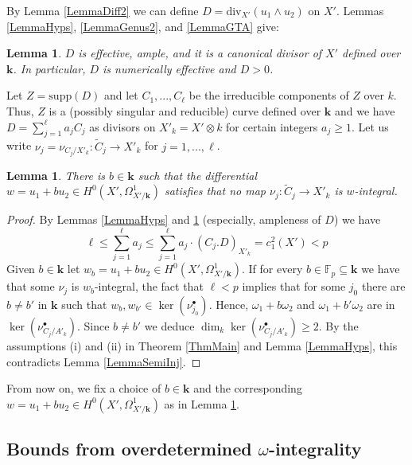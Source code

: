 \documentclass[11pt]{amsart}
\newtheorem{lemma}[theorem]{Lemma}
\theoremstyle{remark}
\numberwithin{equation}{section}
\newcommand{\F}{\mathbb{F}}
\newcommand{\kk}{\mathbf{k}}
\newcommand{\supp}{\mathrm{supp}}
\newcommand{\divi}{\mathrm{div}}
\begin{document}
 By Lemma \ref{LemmaDiff2} we can define $D=\divi_{X'}(u_1\wedge u_2)$ on $X'$. Lemmas \ref{LemmaHyps}, \ref{LemmaGenus2},  and \ref{LemmaGTA} give:
 
 \begin{lemma}\label{LemmaAAA}  $D$ is effective, ample,  and it is a canonical divisor of $X'$ defined over $\kk$. In particular, $D$ is numerically effective and $D> 0$.
\end{lemma}


Let $Z=\supp(D)$ and let $C_1,...,C_\ell$ be the irreducible components of $Z$ over $k$. Thus, $Z$ is a (possibly singular and reducible) curve defined over $\kk$ and we have $D=\sum_{j=1}^\ell a_j C_j$ as divisors on $X'_k=X'\otimes k$ for certain integers $a_j\ge 1$. Let us write $\nu_j=\nu_{C_j/X'_k}:\widetilde{C}_j\to X'_k$ for $j=1,...,\ell$.

\begin{lemma}\label{LemmaChoicew} There is $b\in \kk$ such that the differential $w=u_1+bu_2\in H^0(X',\Omega^1_{X'/\kk})$ satisfies that no map $\nu_j:\widetilde{C}_j\to X'_k$ is $w$-integral.
\end{lemma}
\begin{proof} By Lemmas \ref{LemmaHyps} and \ref{LemmaAAA} (especially, ampleness of $D$) we have 
$$
\ell \le \sum_{j=1}^\ell a_j \le \sum_{j=1}^\ell a_j\cdot (C_j.D)_{X'_k}=c_1^2(X')<p
$$
Given $b\in \kk$ let $w_b=u_1+bu_2\in H^0(X',\Omega^1_{X'/\kk})$. If for every $b\in \F_p\subseteq \kk$ we have that some $\nu_{j}$ is $w_b$-integral, the fact that $\ell<p$ implies that for some $j_0$ there are $b\ne b'$ in $\kk$ such that $w_b,w_{b'}\in \ker(\nu_{j_0}^\bullet)$. Hence, $\omega_1+b\omega_2$ and $\omega_1+b'\omega_2$ are in $\ker (\nu_{C_j/A'_k}^\bullet)$. Since $b\ne b'$ we deduce $\dim_k \ker (\nu_{C_j/A'_k}^\bullet)\ge 2$. By the assumptions (i) and (ii) in Theorem \ref{ThmMain} and Lemma \ref{LemmaHyps}, this contradicts Lemma \ref{LemmaSemiInj}.
\end{proof}

From now on, we fix a choice of $b\in \kk$ and the corresponding $w=u_1+bu_2\in H^0(X',\Omega^1_{X'/\kk})$ as in Lemma \ref{LemmaChoicew}.





\subsection{Bounds from overdetermined $\omega$-integrality}\label{SecBoundsOver} %
\end{document}
